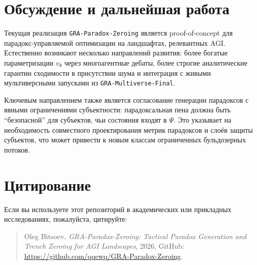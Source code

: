 \documentclass[11pt]{article}
\begin{document}
\section{Обсуждение и дальнейшая работа}

Текущая реализация \texttt{GRA-Paradox-Zeroing} является proof-of-concept для парадокс-управляемой оптимизации на ландшафтах, релевантных AGI. 
Естественно возникают несколько направлений развития: более богатые параметризации $v_{\theta}$ через многоагентные дебаты, более строгие аналитические гарантии сходимости в присутствии шума и интеграция с живыми мультиверсными запусками из \texttt{GRA-Multiverse-Final}.

Ключевым направлением также является согласование генерации парадоксов с явными ограничениями субъектности: парадоксальная пена должна быть ``безопасной'' для субъектов, чьи состояния входят в $\Psi$. 
Это указывает на необходимость совместного проектирования метрик парадоксов и слоёв защиты субъектов, что может привести к новым классам ограниченных бульдозерных потоков.

\section*{Цитирование}

Если вы используете этот репозиторий в академических или прикладных исследованиях, пожалуйста, цитируйте:
\begin{quote}
Oleg Bitsoev, \emph{GRA-Paradox-Zeroing: Tactical Paradox Generation and Trench Zeroing for AGI Landscapes}, 2026, GitHub: \url{https://github.com/qqewq/GRA-Paradox-Zeroing}.
\end{quote}
\end{document}
